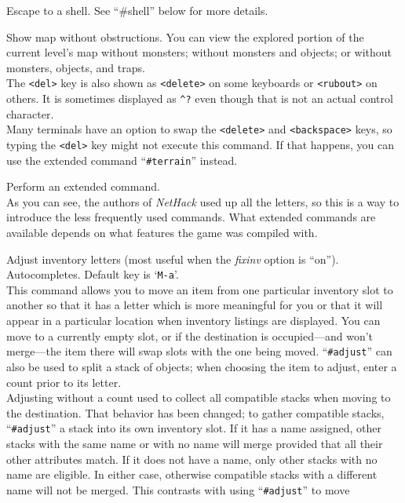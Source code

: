 \documentclass[titlepage]{article}
\begin{document}
\begin{description}[font=\mdseries\ttfamily]
\item[!]
Escape to a shell.
See ``\#shell'' below for more details.
\item[Del]
Show map without obstructions.
You can view the explored portion of the current level's map without
monsters; without monsters and objects; or without monsters, objects,
and traps.\\
The \texttt{<del>} key is also shown as \texttt{<delete>} on some keyboards or
\texttt{<rubout>} on others.
It is sometimes displayed as \texttt{\textasciicircum ?} even though that is not an actual
control character.\\
Many terminals have an option to swap the \texttt{<delete>} and \texttt{<backspace>}
keys, so typing the \texttt{<del>} key might not execute this command.
If that happens, you can use the extended command ``\texttt{\#terrain}'' instead.
\item[\#]
Perform an extended command.\\
As you can see, the authors of \textit{NetHack}
used up all the letters, so this is a way to introduce the less frequently
used commands.
What extended commands are available depends on what features
the game was compiled with.
\item[\#adjust]
Adjust inventory letters (most useful when the
\textit{fixinv}
option is ``on''). Autocompletes. Default key is `\texttt{M-a}'.\\
This command allows you to move an item from one particular inventory
slot to another so that it has a letter which is more meaningful for you
or that it will appear in a particular location when inventory listings
are displayed.
You can move to a currently empty slot, or if the destination is
occupied---and won't merge---the
item there will swap slots with the one being moved.
``\texttt{\#adjust}'' can also be used to split a stack of objects; when
choosing the item to adjust, enter a count prior to its letter.\\
Adjusting without a count used to collect all compatible stacks when
moving to the destination.  That behavior has been changed; to gather
compatible stacks, ``\texttt{\#adjust}'' a stack into its own inventory slot.
If it has a name assigned, other stacks with the same name or with
no name will merge provided that all their other attributes match.
If it does not have a name, only other stacks with no name are eligible.
In either case, otherwise compatible stacks with a different name
will not be merged.  This contrasts with using ``\texttt{\#adjust}'' to move

\end{description}
\end{document}
